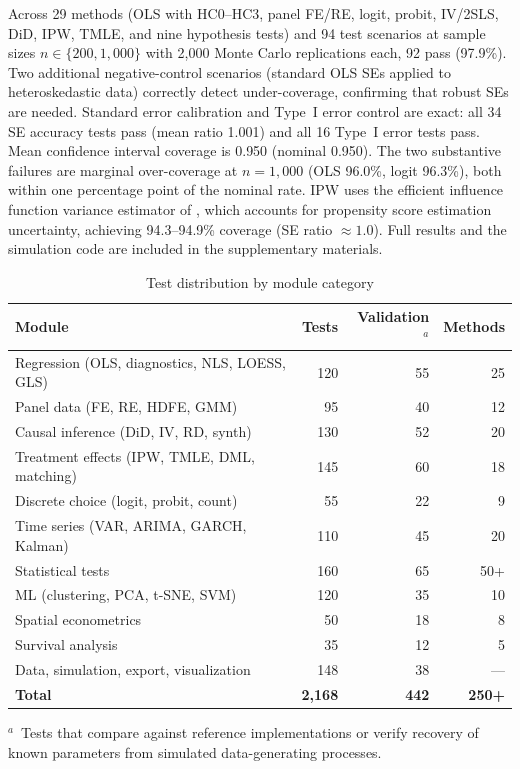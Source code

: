 Across 29 methods (OLS with HC0--HC3, panel FE/RE, logit, probit,
IV/2SLS, DiD, IPW, TMLE, and nine hypothesis tests) and 94 test
scenarios at sample sizes $n \in \{200, 1{,}000\}$ with 2{,}000
Monte Carlo replications each, 92 pass (97.9\%).  Two additional
negative-control scenarios (standard OLS SEs applied to
heteroskedastic data) correctly detect under-coverage, confirming
that robust SEs are needed.  Standard error calibration and Type~I
error control are exact: all 34 SE accuracy tests pass (mean ratio
1.001) and all 16 Type~I error tests pass.  Mean confidence interval
coverage is 0.950 (nominal 0.950).  The two substantive failures are
marginal over-coverage at $n = 1{,}000$ (OLS 96.0\%, logit 96.3\%),
both within one percentage point of the nominal rate.  IPW uses the
efficient influence function variance estimator of
\citet{Lunceford2004}, which accounts for propensity score estimation
uncertainty, achieving 94.3--94.9\% coverage (SE ratio $\approx
1.0$).  Full results and the simulation code are included in the
supplementary materials.

\begin{table}[htbp]
\centering
\begin{threeparttable}
\caption{Test distribution by module category}
\label{tab:test-distribution}
\small
\begin{tabular}{lrrr}
\toprule
Module & Tests & Validation$^a$ & Methods \\
\midrule
Regression (OLS, diagnostics, NLS, LOESS, GLS) & 120 & 55 & 25 \\
Panel data (FE, RE, HDFE, GMM) & 95 & 40 & 12 \\
Causal inference (DiD, IV, RD, synth) & 130 & 52 & 20 \\
Treatment effects (IPW, TMLE, DML, matching) & 145 & 60 & 18 \\
Discrete choice (logit, probit, count) & 55 & 22 & 9 \\
Time series (VAR, ARIMA, GARCH, Kalman) & 110 & 45 & 20 \\
Statistical tests & 160 & 65 & 50+ \\
ML (clustering, PCA, t-SNE, SVM) & 120 & 35 & 10 \\
Spatial econometrics & 50 & 18 & 8 \\
Survival analysis & 35 & 12 & 5 \\
Data, simulation, export, visualization & 148 & 38 & --- \\
\midrule
\textbf{Total} & \textbf{2{,}168} & \textbf{442} & \textbf{250+} \\
\bottomrule
\end{tabular}
\begin{tablenotes}[flushleft]
\item $^a$~Tests that compare against  reference
implementations or verify recovery of known parameters from simulated
data-generating processes.
\end{tablenotes}
\end{threeparttable}
\end{table}

